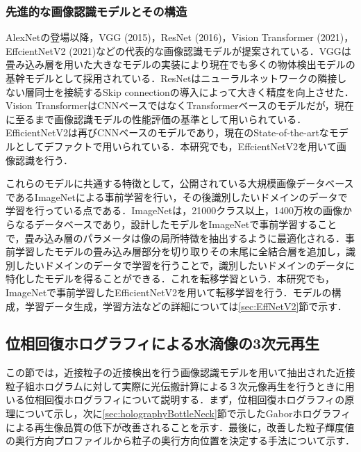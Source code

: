 \subsubsection{先進的な画像認識モデルとその構造}
AlexNet\cite{krizhevsky2012}の登場以降，VGG (2015)\cite{simonyan2015}，ResNet (2016)\cite{he2016}，Vision Transformer (2021)\cite{dosovitskiy2021}，EffcientNetV2 (2021)\cite{tan2021}などの代表的な画像認識モデルが提案されている．VGGは畳み込み層を用いた大きなモデルの実装により現在でも多くの物体検出モデルの基幹モデルとして採用されている．ResNetはニューラルネットワークの隣接しない層同士を接続するSkip connectionの導入によって大きく精度を向上させた．Vision TransformerはCNNベースではなくTransformer\cite{vaswani2017}ベースのモデルだが，現在に至るまで画像認識モデルの性能評価の基準として用いられている．EfficientNetV2は再びCNNベースのモデルであり，現在のState-of-the-artなモデルとしてデファクトで用いられている．本研究でも，EffcientNetV2を用いて画像認識を行う．

これらのモデルに共通する特徴として，公開されている大規模画像データベースであるImageNet\cite{deng2009}による事前学習を行い，その後識別したいドメインのデータで学習を行っている点である．ImageNetは，\num{21000}クラス以上，\num{1400}万枚の画像からなるデータベースであり，設計したモデルをImageNetで事前学習することで，畳み込み層のパラメータは像の局所特徴を抽出するように最適化される．事前学習したモデルの畳み込み層部分を切り取りその末尾に全結合層を追加し，識別したいドメインのデータで学習を行うことで，識別したいドメインのデータに特化したモデルを得ることができる．これを転移学習\cite{zhuang2020}という．本研究でも，ImageNetで事前学習したEfficientNetV2を用いて転移学習を行う．モデルの構成，学習データ生成，学習方法などの詳細については\ref{sec:EffNetV2}節で示す．


\subsection{位相回復ホログラフィによる水滴像の3次元再生}
この節では，近接粒子の近接検出を行う画像認識モデルを用いて抽出された近接粒子組ホログラムに対して実際に光伝搬計算による３次元像再生を行うときに用いる位相回復ホログラフィについて説明する．まず，位相回復ホログラフィの原理について示し，次に\ref{sec:holographyBottleNeck}節で示したGaborホログラフィによる再生像品質の低下が改善されることを示す．最後に，改善した粒子輝度値の奥行方向プロファイルから粒子の奥行方向位置を決定する手法について示す．

